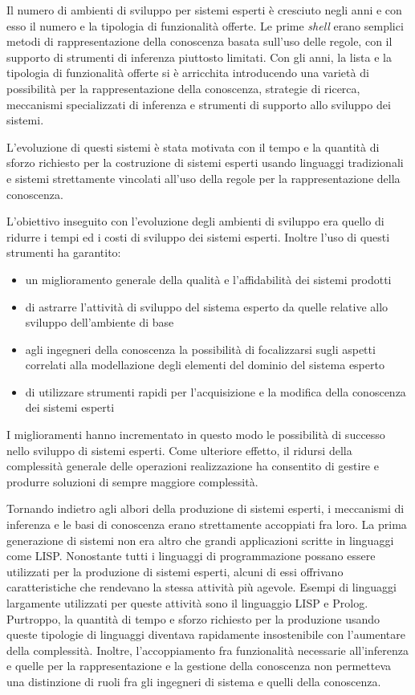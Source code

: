 Il numero di ambienti di sviluppo per sistemi esperti è cresciuto negli anni e con esso il numero e la tipologia di funzionalità offerte. Le prime \emph{shell} erano semplici metodi di rappresentazione della conoscenza basata sull'uso delle regole, con il supporto di strumenti di inferenza piuttosto limitati. Con gli anni, la lista e la tipologia di funzionalità offerte si è arricchita introducendo una varietà di possibilità per la rappresentazione della conoscenza, strategie di ricerca, meccanismi specializzati di inferenza e strumenti di supporto allo sviluppo dei sistemi.

L'evoluzione di questi sistemi è stata motivata con il tempo e la quantità di sforzo richiesto per la costruzione di sistemi esperti usando linguaggi tradizionali e sistemi strettamente vincolati all'uso della regole per la rappresentazione della conoscenza.

L'obiettivo inseguito con l'evoluzione degli ambienti di sviluppo era quello di ridurre i tempi ed i costi di sviluppo dei sistemi esperti. Inoltre l'uso di questi strumenti ha garantito:
\begin{itemize}
	\item un miglioramento generale della qualità e l'affidabilità dei sistemi prodotti
	\item di astrarre l'attività di sviluppo del sistema esperto da quelle relative allo sviluppo dell'ambiente di base
	\item agli ingegneri della conoscenza la possibilità di focalizzarsi sugli aspetti correlati alla modellazione degli elementi del dominio del sistema esperto
	\item di utilizzare strumenti rapidi per l'acquisizione e la modifica della conoscenza dei sistemi esperti
\end{itemize}

I miglioramenti hanno incrementato in questo modo le possibilità di successo nello sviluppo di sistemi esperti. Come ulteriore effetto, il ridursi della complessità generale delle operazioni realizzazione ha consentito di gestire e produrre soluzioni di sempre maggiore complessità.

Tornando indietro agli albori della produzione di sistemi esperti, i meccanismi di inferenza e le basi di conoscenza erano strettamente accoppiati fra loro. La prima generazione di sistemi non era altro che grandi applicazioni scritte in linguaggi come LISP. Nonostante tutti i linguaggi di programmazione possano essere utilizzati per la produzione di sistemi esperti, alcuni di essi offrivano caratteristiche che rendevano la stessa attività più agevole. Esempi di linguaggi largamente utilizzati per queste attività sono il linguaggio LISP e Prolog. Purtroppo, la quantità di tempo e sforzo richiesto per la produzione usando queste tipologie di linguaggi diventava rapidamente insostenibile con l'aumentare della complessità. Inoltre, l'accoppiamento fra funzionalità necessarie all'inferenza e quelle per la rappresentazione e la gestione della conoscenza non permetteva una distinzione di ruoli fra gli ingegneri di sistema e quelli della conoscenza.

